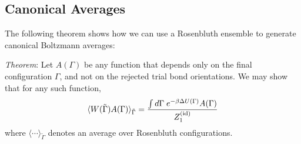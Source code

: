 \documentclass[12pt]{article}
\newcommand\chain{\Gamma}
\newcommand\delU{\Delta U}
\newcommand\Zid{Z^{({\rm id})}}
\newcommand\rconfig{\tilde{\chain}}
\begin{document}
\subsection{Canonical Averages}
The following theorem shows how we can use a Rosenbluth ensemble to generate canonical Boltzmann averages: 

{\it Theorem}: Let $A(\chain)$ be any function that depends only on the final configuration $\chain$, and not on the rejected trial bond orientations. We may show that for any such function,
\begin{equation}
   \langle W(\rconfig) A(\chain) \rangle_{\rconfig} =
   \frac{\int d\chain \; e^{-\beta\delU(\chain)}A(\chain)}
         {\Zid_{1}} 
   \label{RosenbluthIntegralThm}
\end{equation}
where $\langle \cdots \rangle_{\rconfig}$ denotes an average over
Rosenbluth configurations. 
\vspace{12pt}
\end{document}
